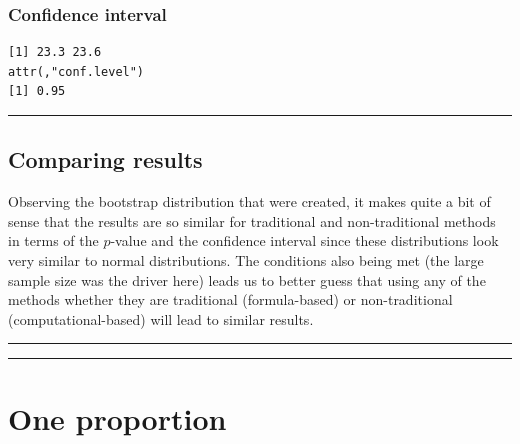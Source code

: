 \documentclass[12pt, krantz2,]{krantz}
\makeatletter
\newenvironment{Shaded}{\begin{snugshade}}{\end{snugshade}}
\newcommand{\DataTypeTok}[1]{\textcolor[rgb]{0.27,0.27,0.27}{#1}}
\newcommand{\DecValTok}[1]{\textcolor[rgb]{0.06,0.06,0.06}{#1}}
\newcommand{\KeywordTok}[1]{\textcolor[rgb]{0.27,0.27,0.27}{\textbf{#1}}}
\newcommand{\NormalTok}[1]{#1}
\newcommand{\OperatorTok}[1]{\textcolor[rgb]{0.43,0.43,0.43}{\textbf{#1}}}
\newcommand{\StringTok}[1]{\textcolor[rgb]{0.5,0.5,0.5}{#1}}
\newenvironment{kframe}{%
\medskip{}
\setlength{\fboxsep}{.8em}
 \def\at@end@of@kframe{}%
 \ifinner\ifhmode%
  \def\at@end@of@kframe{\end{minipage}}%
  \begin{minipage}{\columnwidth}%
 \fi\fi%
 \def\FrameCommand##1{\hskip\@totalleftmargin \hskip-\fboxsep
 \colorbox{shadecolor}{##1}\hskip-\fboxsep
     \hskip-\linewidth \hskip-\@totalleftmargin \hskip\columnwidth}%
 \MakeFramed {\advance\hsize-\width
   \@totalleftmargin\z@ \linewidth\hsize
   \@setminipage}}%
 {\par\unskip\endMakeFramed%
 \at@end@of@kframe}
\renewenvironment{Shaded}{\begin{kframe}}{\end{kframe}}
\makeatother
\begin{document}
\hypertarget{confidence-interval}{%
\subsubsection*{Confidence interval}\label{confidence-interval}}


\begin{Shaded}
\end{Shaded}

\begin{verbatim}
[1] 23.3 23.6
attr(,"conf.level")
[1] 0.95
\end{verbatim}

\begin{center}\rule{0.5\linewidth}{\linethickness}\end{center}

\hypertarget{comparing-results}{%
\subsection{Comparing results}\label{comparing-results}}

Observing the bootstrap distribution that were created, it makes quite a bit of sense that the results are so similar for traditional and non-traditional methods in terms of the \(p\)-value and the confidence interval since these distributions look very similar to normal distributions. The conditions also being met (the large sample size was the driver here) leads us to better guess that using any of the methods whether they are traditional (formula-based) or non-traditional (computational-based) will lead to similar results.

\begin{center}\rule{0.5\linewidth}{\linethickness}\end{center}

\begin{center}\rule{0.5\linewidth}{\linethickness}\end{center}

\hypertarget{one-proportion}{%
\section{One proportion}\label{one-proportion}}
\end{document}
